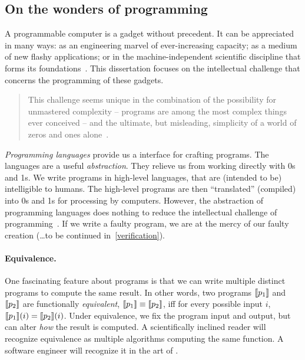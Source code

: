 \subsection{On the wonders of programming}
\label{subsec:programming-wonders}

A programmable computer is a gadget without precedent.
It can be appreciated in many ways:
as an engineering marvel of ever-increasing capacity;
as a medium of new flashy applications;
or in the machine-independent scientific discipline that forms its foundations~\cite{dijkstra1979a,hoare2006}.
This dissertation focuses on the intellectual challenge that concerns the {programming} of these gadgets.

\begin{quotation}
\noindent This challenge seems unique in the combination of the possibility for unmastered complexity -- programs are among the most
complex things ever conceived -- and the ultimate, but misleading, simplicity of a world of zeros and ones alone~\cite{dijkstra1979a}.
\end{quotation}

\emph{Programming languages} provide us a interface for crafting programs.
The languages are a useful \emph{abstraction}.
They relieve us from working directly with 0s and 1s.
We write programs in {high-level} languages, that are (intended to be) intelligible to humans.
The high-level programs are then \enquote{translated} (compiled) into 0s and 1s for processing by computers.
However, the abstraction of programming languages does nothing to reduce the intellectual challenge of programming~\cite{dijkstra1979b}.
If we write a faulty program, we are at the mercy of our faulty creation (\ldots to be continued in~\autoref{verification}).

\paragraph{Equivalence.}
One fascinating feature about programs is that we can write multiple distinct programs to compute the same result.
In other words, two programs $\llbracket p_1\rrbracket$ and $\llbracket p_2\rrbracket$ are functionally \emph{equivalent}, \ie \(\llbracket p_1\rrbracket \equiv \llbracket p_2\rrbracket\), iff for every possible input \(i\), \(\llbracket p_1\rrbracket(i) = \llbracket p_2\rrbracket(i)\).
Under equivalence, we fix the program input and output, but can alter \emph{how} the result is computed.
A scientifically inclined reader will recognize equivalence as multiple algorithms computing the same function.
A software engineer will recognize it in the art of .

